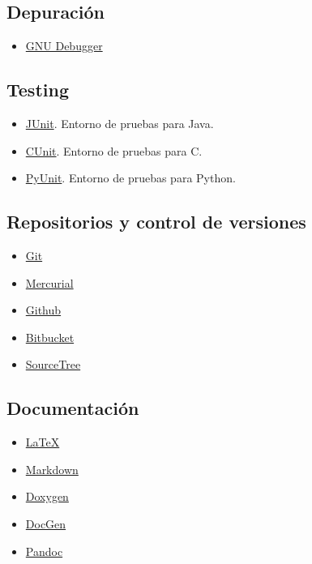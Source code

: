 \subsection{Depuración}
\begin{itemize}[nosep]
\item \href{https://www.gnu.org/s/gdb/}{GNU Debugger}
\end{itemize}


\subsection{Testing}
\begin{multicols}{2}
\begin{itemize}[nosep]
\item \href{http://junit.org}{JUnit}. Entorno de pruebas para Java.
\item \href{http://cunit.sourceforge.net/}{CUnit}. Entorno de pruebas para C.
\item \href{https://wiki.python.org/moin/PyUnit}{PyUnit}. Entorno de pruebas para Python.
\end{itemize}
\end{multicols}

\subsection{Repositorios y control de versiones}
\begin{multicols}{2}
\begin{itemize}[nosep]
\item \href{https://git-scm.com/}{Git}
\item \href{https://www.mercurial-scm.org/}{Mercurial}
\item \href{https://github.com/}{Github}
\item \href{https://bitbucket.org/}{Bitbucket}
\item \href{https://www.sourcetreeapp.com/}{SourceTree}
\end{itemize}
\end{multicols}

\newpage
\subsection{Documentación}
\begin{multicols}{2}
\begin{itemize}[nosep]
\item \href{https://www.latex-project.org/}{\LaTeX}
\item \href{https://markdown.es/}{Markdown}
\item \href{http://www.stack.nl/\%7Edimitri/doxygen/index.html}{Doxygen}
\item \href{http://mtmacdonald.github.io/docgen/docs/index.html}{DocGen}
\item \href{http://pandoc.org/}{Pandoc}
\end{itemize}
\end{multicols}


